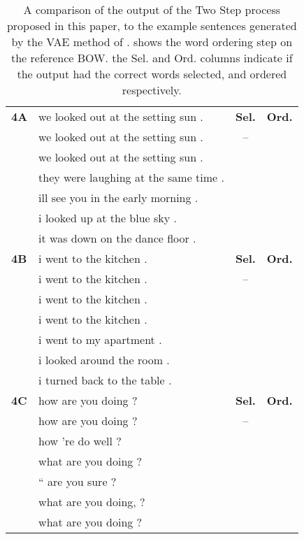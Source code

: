 \documentclass[class=article]{standalone}
\newcommand{\cmark}{\ding{51}}%
\newcommand{\xmark}{\ding{55}}%
\newcommand{\passmark}{--}
\begin{document}
	\begin{table}
		\small
		
		\begin{tabular}{ p{\collenone} p{\collentwo} C{\collenthree} C{\collenthree} }
			
			\textbf{4A \hfill {}}  & we looked out at the setting sun . & \textbf{Sel.} & \textbf{Ord.} \\
			\textbf{\oracletitle}  & we looked out at the setting sun . & \passmark & \cmark \\
			\textbf{\twosteptitle}  & we looked out at the setting sun . & \cmark & \cmark \\
			\textbf{\bm}  & they were laughing at the same time . &  &  \\
			\textbf{}  & ill see you in the early morning . &  &  \\
			\textbf{}  & i looked up at the blue sky . &  &  \\
			\textbf{}  & it was down on the dance floor . &  &  \\
			\hline
			\textbf{4B \hfill {}}  & i went to the kitchen . & \textbf{Sel.} & \textbf{Ord.} \\
			\textbf{\oracletitle}  & i went to the kitchen . & \passmark & \cmark \\
			\textbf{\twosteptitle}  & i went to the kitchen . & \cmark & \cmark \\
			\textbf{\bm}  & i went to the kitchen . &  &  \\
			\textbf{}  & i went to my apartment .  &  &  \\
			\textbf{}  & i looked around the room . &  &  \\
			\textbf{}  & i turned back to the table . &  &  \\
			\hline
			\textbf{4C \hfill {}}  & how are you doing ? & \textbf{Sel.} & \textbf{Ord.} \\
			\textbf{\oracletitle}  & how are you doing ? & \passmark & \cmark \\
			\textbf{\twosteptitle}  & how 're do well ? & \xmark & \xmark \\
			\textbf{\bm}  & what are you doing ? &  &  \\
			\textbf{}  & “ are you sure ? &  &  \\
			\textbf{}  & what are you doing, ? &  &  \\
			\textbf{}  & what are you doing ? &  &  \\
		\end{tabular}
		
		\caption{\label{egbowman} A comparison of the output of the Two Step process proposed in this paper, to the example sentences generated by the VAE method of \textcite{Bowman2015SmoothGeneration}. 
		\oracletitle{}  shows the word ordering step on the reference BOW. the Sel. and Ord. columns indicate if the output had the correct words selected, and ordered respectively.}
	\end{table}
\end{document}
